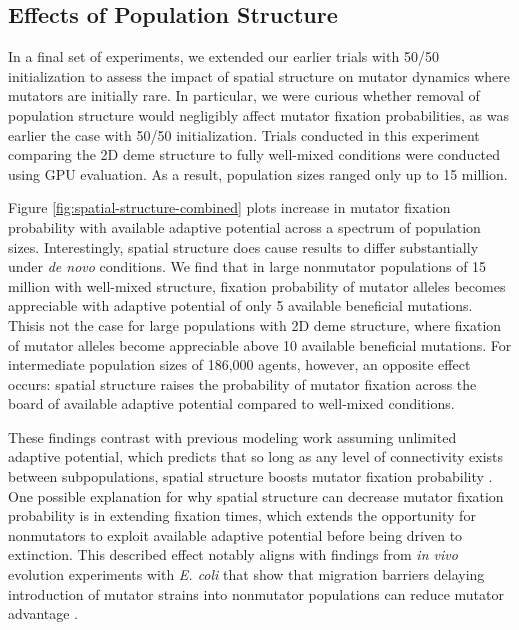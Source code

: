 \subsection{Effects of Population Structure}
\label{sec:population-structure}

In a final set of experiments, we extended our earlier trials with 50/50 initialization to assess the impact of spatial structure on mutator dynamics where mutators are initially rare.
In particular, we were curious whether removal of population structure would negligibly affect mutator fixation probabilities, as was earlier the case with 50/50 initialization.
Trials conducted in this experiment comparing the 2D deme structure to fully well-mixed conditions were conducted using GPU evaluation.
As a result, population sizes ranged only up to 15 million.



Figure \ref{fig:spatial-structure-combined} plots increase in mutator fixation probability with available adaptive potential across a spectrum of population sizes.
Interestingly, spatial structure does cause results to differ substantially under \textit{de novo} conditions.
We find that in large nonmutator populations of 15 million with well-mixed structure, fixation probability of mutator alleles becomes appreciable with adaptive potential of only 5 available beneficial mutations.
Thisis not the case for large populations with 2D deme structure, where fixation of mutator alleles become appreciable above 10 available beneficial mutations.
For intermediate population sizes of 186,000 agents, however, an opposite effect occurs: spatial structure raises the probability of mutator fixation across the board of available adaptive potential compared to well-mixed conditions.

These findings contrast with previous modeling work assuming unlimited adaptive potential, which predicts that so long as any level of connectivity exists between subpopulations, spatial structure boosts mutator fixation probability \citep{raynes2019migration}.
One possible explanation for why spatial structure can decrease mutator fixation probability is in extending fixation times, which extends the opportunity for nonmutators to exploit available adaptive potential before being driven to extinction.
This described effect notably aligns with findings from \textit{in vivo} evolution experiments with \textit{E. coli} that show that migration barriers delaying introduction of mutator strains into nonmutator populations can reduce mutator advantage \citep{lechat2006escherichia}.

